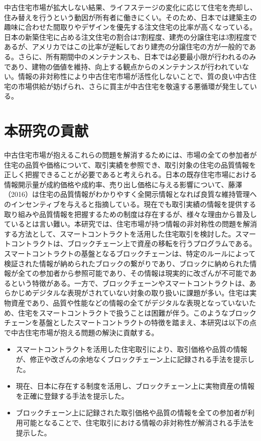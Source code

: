 \documentclass[a4paper,fontsize=11pt,report,notitlepage,line_length=38zw,number_of_lines=40,dvipdfmx]{jlreq}
\begin{document}
中古住宅市場が拡大しない結果、ライフステージの変化に応じて住宅を売却し、住み替えを行うという動因が所有者に働きにくい。そのため、日本では建築主の趣味に合わせた間取りやデザインを優先する注文住宅の比率が高くなっている。日本の新築住宅に占める注文住宅の割合は7割程度、建売の分譲住宅は3割程度であるが、アメリカではこの比率が逆転しており建売の分譲住宅の方が一般的である。さらに、所有期間中のメンテナンスも、日本では必要最小限が行われるのみであり、建物の価値を維持、向上する観点からのメンテナンスが行われていない。情報の非対称性により中古住宅市場が活性化しないことで、質の良い中古住宅の市場供給が妨げられ、さらに買主が中古住宅を敬遠する悪循環が発生している。

\section{本研究の貢献}
中古住宅市場が抱えるこれらの問題を解消するためには、市場の全ての参加者が住宅の品質や価格について、取引実績を参照でき、取引対象の住宅の品質情報を正しく把握できることが必要であると考えられる。日本の既存住宅市場における情報開示量が成約価格や成約率、売り出し価格に与える影響について、藤澤（2016）\cite{fujisawa2016}は住宅の品質情報がわかりやすく全開示情報となれば良質な維持管理へのインセンティブを与えると指摘している。現在でも取引実績の情報を提供する取り組みや品質情報を把握するための制度は存在するが、様々な理由から普及しているとは言い難い。本研究では、住宅市場が持つ情報の非対称性の問題を解消する方法として、スマートコントラクトを活用した住宅取引を検討した。スマートコントラクトは、ブロックチェーン上で資産の移転を行うプログラムである。スマートコントラクトの基盤となるブロックチェーンは、特定のルールによって検証された情報が納められたブロックの繋がりであり、ブロックに納められた情報が全ての参加者から参照可能であり、その情報は現実的に改ざんが不可能であるという特徴がある。一方で、ブロックチェーンやスマートコントラクトは、あらかじめデジタルな表現がされていない対象の取り扱いに課題が多い。住宅は実物資産であり、品質や性能などの情報の全てがデジタルな表現となっていないため、住宅をスマートコントラクトで扱うことは困難が伴う。このようなブロックチェーンを基盤としたスマートコントラクトの特徴を踏まえ、本研究は以下の点で中古住宅市場が抱える問題の解決に貢献する。
\begin{itemize}
\item スマートコントラクトを活用した住宅取引により、取引価格や品質の情報が、修正や改ざんの余地なくブロックチェーン上に記録される手法を提示した。
\item 現在、日本に存在する制度を活用し、ブロックチェーン上に実物資産の情報を正確に登録する手法を提示した。
\item ブロックチェーン上に記録された取引価格や品質の情報を全ての参加者が利用可能となることで、住宅取引における情報の非対称性が解消される手法を提示した。
\end{itemize}
\end{document}
